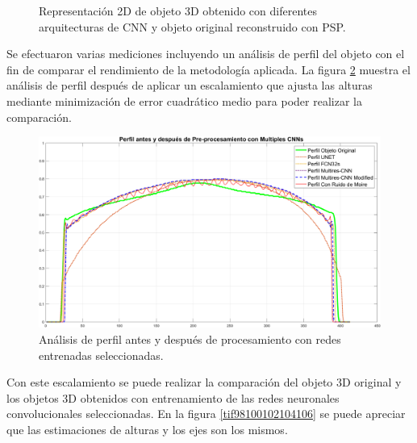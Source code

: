 \documentclass[10pt,letterpaper]{article}
\begin{document}
\begin{figure}[H]
\begin{center}
{            \label{tif116}}
        \caption{Representación 2D de objeto 3D obtenido con diferentes arquitecturas de CNN y objeto original reconstruido con PSP.}
        \label{tif112113114115116117}
      \end{center}
\end{figure}

Se efectuaron varias mediciones incluyendo un análisis de perfil del objeto con el fin de comparar el rendimiento de la metodología aplicada. La figura \ref{tif97} muestra el análisis de perfil después de aplicar un escalamiento que ajusta las alturas mediante minimización de error cuadrático medio\cite{Alfa:Mont} para poder realizar la comparación. %

\begin{figure}[H]
	\centering
    \includegraphics[width=1\textwidth]{tifs/tif97.png}
    \caption{Análisis de perfil antes y después de procesamiento con redes entrenadas seleccionadas.}
    \label{tif97}
\end{figure}

Con este escalamiento se puede realizar la comparación del objeto 3D original y los objetos 3D obtenidos con entrenamiento de las redes neuronales convolucionales seleccionadas. En la figura \ref{tif98100102104106} se puede apreciar que las estimaciones de alturas y los ejes son los mismos.
\end{document}
